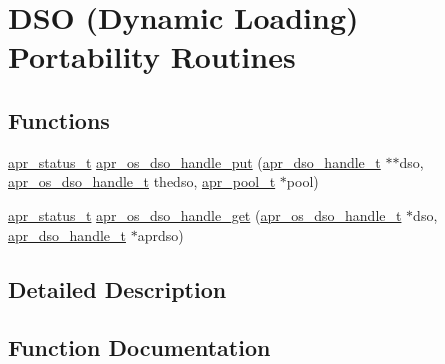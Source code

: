 \hypertarget{group__apr__os__dso}{}\section{D\+SO (Dynamic Loading) Portability Routines}
\label{group__apr__os__dso}
\subsection*{Functions}
\begin{DoxyCompactItemize}
\item 
\hyperlink{group__apr__errno_gaf76ee4543247e9fb3f3546203e590a6c}{apr\+\_\+status\+\_\+t} \hyperlink{group__apr__os__dso_gac8852ec406fad593be38c0dfbb401633}{apr\+\_\+os\+\_\+dso\+\_\+handle\+\_\+put} (\hyperlink{group__apr__dso_ga85e7e28490d026aeed78bd78e9933472}{apr\+\_\+dso\+\_\+handle\+\_\+t} $\ast$$\ast$dso, \hyperlink{group__apr__portabile_ga542684803ee8ab0abd69077697599ec0}{apr\+\_\+os\+\_\+dso\+\_\+handle\+\_\+t} thedso, \hyperlink{group__apr__pools_gaf137f28edcf9a086cd6bc36c20d7cdfb}{apr\+\_\+pool\+\_\+t} $\ast$pool)
\item 
\hyperlink{group__apr__errno_gaf76ee4543247e9fb3f3546203e590a6c}{apr\+\_\+status\+\_\+t} \hyperlink{group__apr__os__dso_ga35f9c50b7e546d0c33985442a9c4aa6e}{apr\+\_\+os\+\_\+dso\+\_\+handle\+\_\+get} (\hyperlink{group__apr__portabile_ga542684803ee8ab0abd69077697599ec0}{apr\+\_\+os\+\_\+dso\+\_\+handle\+\_\+t} $\ast$dso, \hyperlink{group__apr__dso_ga85e7e28490d026aeed78bd78e9933472}{apr\+\_\+dso\+\_\+handle\+\_\+t} $\ast$aprdso)
\end{DoxyCompactItemize}


\subsection{Detailed Description}


\subsection{Function Documentation}
